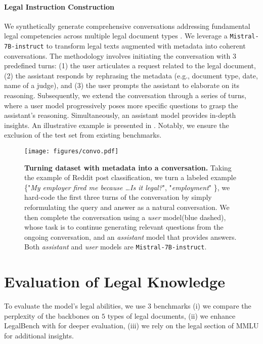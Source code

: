 \paragraph{Legal Instruction Construction}
We synthetically generate comprehensive conversations addressing fundamental legal competencies across multiple legal document types \cite{ding2023enhancing}. We leverage a \texttt{Mistral-7B-instruct} to transform legal texts augmented with metadata into coherent conversations.
The methodology involves initiating the conversation with $3$ predefined turns: (1) the user articulates a request related to the legal document, (2) the assistant responds by rephrasing the metadata (e.g., document type, date, name of a judge), and (3) the user prompts the assistant to elaborate on its reasoning. Subsequently, we extend the conversation through a series of turns, where a user model progressively poses more specific questions to grasp the assistant's reasoning. Simultaneously, an assistant model provides in-depth insights. An illustrative example is presented in . Notably, we ensure the exclusion of the test set from existing benchmarks.

\begin{figure}
    \centering
    \texttt{[image: figures/convo.pdf]}
    \caption{\textbf{Turning dataset with metadata into a conversation.} Taking the example of Reddit post classification, we turn a labeled example \{"\textit{My employer fired me because \dots Is it legal?}", "\textit{employment}" \}, we hard-code the first three turns of the conversation by simply reformulating the query and answer as a natural conversation. We then complete the conversation using a \textit{user} model(blue dashed), whose task is to continue generating relevant questions from the ongoing conversation, and an \textit{assistant} model that provides answers. Both \textit{assistant} and \textit{user} models are \texttt{Mistral-7B-instruct}.}
    \label{fig:ift_generation}
\end{figure}

\section{Evaluation of Legal Knowledge}
\label{sec:legal_bench_instruct}

To evaluate the model's legal abilities, we use $3$ benchmarks (i) we compare the perplexity of the backbones on $5$ types of legal documents, (ii) we enhance LegalBench with \legalbench{} for deeper evaluation, (iii) we rely on the legal section of MMLU for additional insights.


